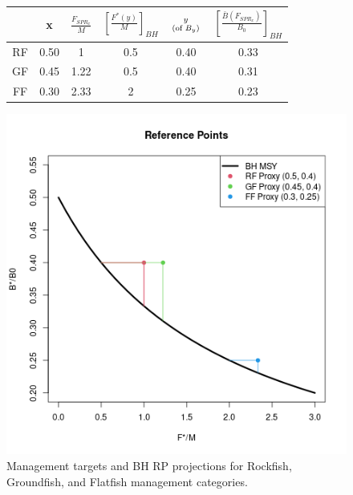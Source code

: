 \begin{figure}
\begin{minipage}[h!]{0.66\textwidth}
\begin{tabular}{c|c|c|c|c|c}
   & x    & $\frac{F_{SPR_x}}{M}$ & $\left[\frac{F^*(y)}{M}\right]_{BH}$ & $y \atop (\text{of }B_y)$ & $\left[\frac{\bar B(F_{SPR_x})}{B_0}\right]_{BH}$ \\ \hline %
RF & 0.50 & 1			  & 0.5 				     & 0.40  	 & 0.33 \\ %
GF & 0.45 & 1.22 		  & 0.5 				     & 0.40  	 & 0.31 \\ %
FF & 0.30 & 2.33		  & 2 				     & 0.25  	 & 0.23 \\ %
\end{tabular}
\caption{ \label{proxyTable}
Management targets and BH RP projections for Rockfish, Groundfish, and Flatfish management categories.
}
\end{minipage}
\begin{minipage}[h!]{0.33\textwidth}
\includegraphics[width=\textwidth]{../gpBias/rpProxTable.png}
\end{minipage}
\end{figure}


